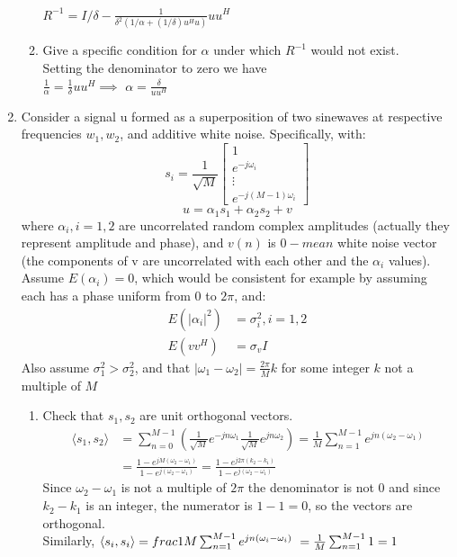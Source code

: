 \documentclass[12pt]{article}
\begin{document}
\begin{enumerate}
\begin{enumerate}
$R^{-1} = I/\delta - \frac{1}{\delta^2(1/\alpha + (1/\delta) u^Hu)}uu^H$
\item Give a specific condition for $\alpha$ under which $R^{-1}$ would not exist.\\
Setting the denominator to zero we have\\
$\frac{1}{\alpha} = \frac{1}{\delta} uu^H \implies$
$\alpha = \frac{\delta}{uu^H}$
\end{enumerate}
\item Consider a signal u formed as a superposition of two sinewaves at respective frequencies $w_1,w_2$, and additive white noise.  Specifically, with:
$$ s_i = \frac{1}{\sqrt{M}} 
\begin{bmatrix}
1\\
e^{-j\omega_i}\\
\vdots\\
e^{-j(M-1)\omega_i}
\end{bmatrix}$$
$$u = \alpha_1 s_1 + \alpha_2 s_2 + v$$
where $\alpha_i,i=1,2$ are uncorrelated random complex amplitudes (actually they represent amplitude and phase), and $v(n)$ is $0-mean$ white noise vector (the components of v are uncorrelated with each other and the $\alpha_i$ values).  Assume $E(\alpha_i) = 0$, which would be consistent for example by assuming each has a phase uniform from $0$ to $2\pi$, and:
\begin{align*}
E(|\alpha_i|^2) &= \sigma_i^2, i=1,2\\
E(vv^H) &= \sigma_v I
\end{align*}
Also assume $\sigma_1^2 > \sigma_2^2$, and that $|\omega_1-\omega_2| = \frac{2\pi}{M}k$ for some integer $k$ not a multiple of $M$
\begin{enumerate}
\item Check that $s_1,s_2$ are unit orthogonal vectors.\\
\begin{align*}
\langle s_1,s_2\rangle &= \sum_{n=0}^{M-1}\left(\frac{1}{\sqrt{M}}e^{-jn\omega_1}\frac{1}{\sqrt{M}}e^{jn\omega_2}\right) = \frac{1}{M}\sum_{n=1}^{M-1}e^{jn(\omega_2-\omega_1)}\\
& = \frac{1-e^{jM(\omega_2-\omega_1)}}{1-e^{j(\omega_2-\omega_1)}} = \frac{1-e^{j2\pi(k_2-k_1)}}{1-e^{j(\omega_2-\omega_1)}}
\end{align*}
Since $\omega_2 - \omega_1$ is not a multiple of $2\pi$ the denominator is not $0$ and since $k_2-k_1$ is an integer, the numerator is $1-1 = 0$, so the vectors are orthogonal. \\
Similarly, $\langle s_i,s_i \rangle = \\frac{1}{M}\sum_{n=1}^{M-1}e^{jn(\omega_i-\omega_i)}\ =\frac{1}{M}\sum_{n=1}^{M-1}1 = 1$\\

\end{enumerate}
\end{enumerate}
\end{document}
